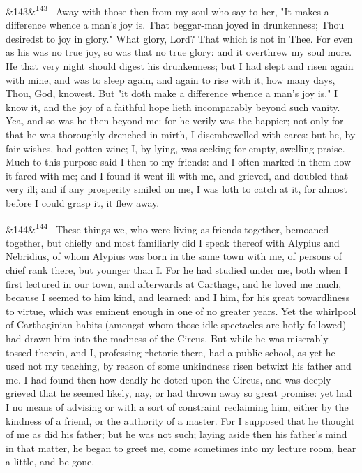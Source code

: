 \documentclass[12pt]{article}
\newcommand{\para}[1][]{\par\noindent\ifx&#1&\else\textsuperscript{\footnotesize #1}~\fi}
\begin{document}
\para[143] Away with those then from my soul who say to her, "It makes a difference whence a man's joy is. That beggar-man joyed in drunkenness; Thou desiredst to joy in glory." What glory, Lord? That which is not in Thee. For even as his was no true joy, so was that no true glory: and it overthrew my soul more. He that very night should digest his drunkenness; but I had slept and risen again with mine, and was to sleep again, and again to rise with it, how many days, Thou, God, knowest. But "it doth make a difference whence a man's joy is." I know it, and the joy of a faithful hope lieth incomparably beyond such vanity. Yea, and so was he then beyond me: for he verily was the happier; not only for that he was thoroughly drenched in mirth, I disembowelled with cares: but he, by fair wishes, had gotten wine; I, by lying, was seeking for empty, swelling praise. Much to this purpose said I then to my friends: and I often marked in them how it fared with me; and I found it went ill with me, and grieved, and doubled that very ill; and if any prosperity smiled on me, I was loth to catch at it, for almost before I could grasp it, it flew away.

\para[144] These things we, who were living as friends together, bemoaned together, but chiefly and most familiarly did I speak thereof with Alypius and Nebridius, of whom Alypius was born in the same town with me, of persons of chief rank there, but younger than I. For he had studied under me, both when I first lectured in our town, and afterwards at Carthage, and he loved me much, because I seemed to him kind, and learned; and I him, for his great towardliness to virtue, which was eminent enough in one of no greater years. Yet the whirlpool of Carthaginian habits (amongst whom those idle spectacles are hotly followed) had drawn him into the madness of the Circus. But while he was miserably tossed therein, and I, professing rhetoric there, had a public school, as yet he used not my teaching, by reason of some unkindness risen betwixt his father and me. I had found then how deadly he doted upon the Circus, and was deeply grieved that he seemed likely, nay, or had thrown away so great promise: yet had I no means of advising or with a sort of constraint reclaiming him, either by the kindness of a friend, or the authority of a master. For I supposed that he thought of me as did his father; but he was not such; laying aside then his father's mind in that matter, he began to greet me, come sometimes into my lecture room, hear a little, and be gone.
\end{document}
